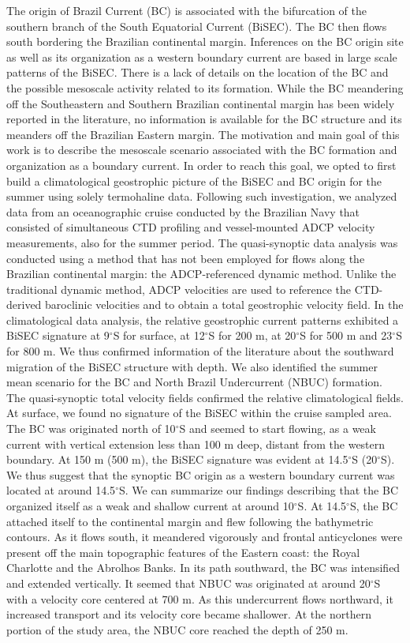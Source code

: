 \hspace{6mm} The origin of Brazil Current (BC) is associated with the 
bifurcation of the southern branch of the South Equatorial Current (BiSEC). The BC then
flows south bordering the Brazilian continental margin. 
Inferences on the BC origin site as well as its organization as a
western boundary current are based in large scale patterns of the
BiSEC. There is a lack of details on the location of the BC and the possible
mesoscale activity related to its formation. While the BC meandering
off the Southeastern and Southern Brazilian continental margin has
been widely reported in the literature, no information is available
for the BC structure and its meanders off the Brazilian Eastern
margin. The motivation and main goal of this work is to describe the
mesoscale scenario associated with the BC formation and organization
as a boundary current. In order to reach this goal, we opted to first
build a climatological geostrophic picture of the BiSEC and BC origin
for the summer using solely termohaline data. Following such
investigation, we analyzed data from an oceanographic cruise conducted by
the Brazilian Navy that consisted of simultaneous CTD profiling and
vessel-mounted ADCP velocity measurements, also for the summer
period. The quasi-synoptic data analysis was conducted using a method
that has not been employed for flows along the Brazilian continental
margin: the ADCP-referenced dynamic method. Unlike the traditional
dynamic method, ADCP velocities are used to reference the CTD-derived
baroclinic velocities and to obtain a total geostrophic velocity
field. In the climatological data analysis, the relative geostrophic
current patterns exhibited a BiSEC signature at 9$^\circ$S for
surface, at 12$^\circ$S for 200 m, at 20$^\circ$S for 500 m and
23$^\circ$S for 800 m. We thus confirmed information of the literature
about the southward migration of the BiSEC structure with depth. We
also identified the summer mean scenario for the BC and North Brazil
Undercurrent (NBUC) formation. The quasi-synoptic total velocity fields
confirmed the relative climatological fields. At surface, we found no
signature of the BiSEC within the cruise sampled area. The BC was
originated north of 10$^\circ$S and seemed to start flowing, as a weak
current with vertical extension less than 100 m deep, distant from the
western boundary. At 150 m (500 m), the BiSEC signature was evident at
14.5$^\circ$S (20$^\circ$S). We thus suggest that the synoptic BC
origin as a western boundary current was located at around
14.5$^\circ$S. We can summarize our findings describing that the BC
organized itself as a weak and shallow current at around 10$^\circ$S.
At 14.5$^\circ$S, the BC attached itself to the continental margin and
flew following the bathymetric contours. As it flows south, it
meandered vigorously and frontal anticyclones were present off the main
topographic features of the Eastern coast: the Royal Charlotte and the
Abrolhos Banks.  In its path southward, the BC was intensified and
extended vertically. It seemed that NBUC was originated at around
20$^\circ$S with a velocity core centered at 700 m. As this
undercurrent flows northward, it increased transport and its velocity
core became shallower. At the northern portion of the study area, the
NBUC core reached the depth of 250 m.
